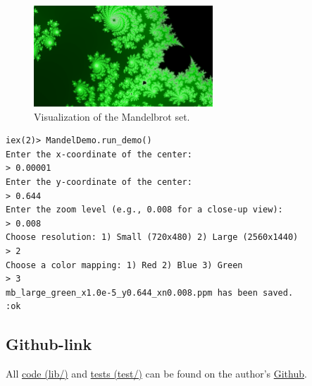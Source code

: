 \documentclass[a4paper,11pt]{article}
\newenvironment{longlisting}{\captionsetup{type=listing}}{}
\begin{document}
\begin{figure}[h!]
    \centering
    \includegraphics[width=0.6\textwidth]{../images/mb_large_green_x1.0e-5_y0.644_xn0.008.png}
    \caption{Visualization of the Mandelbrot set.}
    \label{fig:mandelbrot2}
\end{figure}
\begin{longlisting}
\begin{verbatim}
iex(2)> MandelDemo.run_demo()
Enter the x-coordinate of the center:
> 0.00001
Enter the y-coordinate of the center:
> 0.644
Enter the zoom level (e.g., 0.008 for a close-up view):
> 0.008
Choose resolution: 1) Small (720x480) 2) Large (2560x1440)
> 2
Choose a color mapping: 1) Red 2) Blue 3) Green
> 3
mb_large_green_x1.0e-5_y0.644_xn0.008.ppm has been saved.
:ok
\end{verbatim}
\caption{The prompt that generated figure~\ref{fig:mandelbrot2}
}
\label{listing:demo2}
\end{longlisting}

\subsection*{Github-link}
\noindent All
\href{https://github.com/VincentFerrigan/kth-id1019-programming-ii/tree/main/tasks/7/mandelbrot/}{code (lib/)} and %
\href{https://github.com/VincentFerrigan/kth-id1019-programming-ii/tree/main/tasks/7/mandelbrot/test/}{tests (test/)}
can be found on the author's
\href{https://github.com/VincentFerrigan/kth-id1019-programming-ii/tree/main/tasks/7/mandelbrot/}{Github}.
\end{document}
